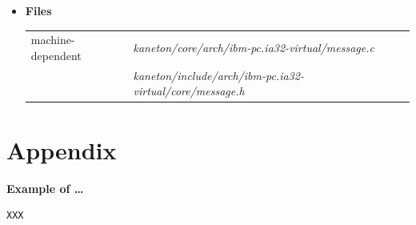 \begin{itemize}
  \item {\bf {Files}}\\

    \begin{tabular}{| l | l |}
      \hline
      machine-dependent & {\em kaneton/core/arch/ibm-pc.ia32-virtual/message.c}\\
      & {\em kaneton/include/arch/ibm-pc.ia32-virtual/core/message.h}\\\hline
    \end{tabular}

\end{itemize}

%
%

\newpage

\section{Appendix}

\textbf{Example of \ldots}

\begin{verbatim}
XXX
\end{verbatim}
